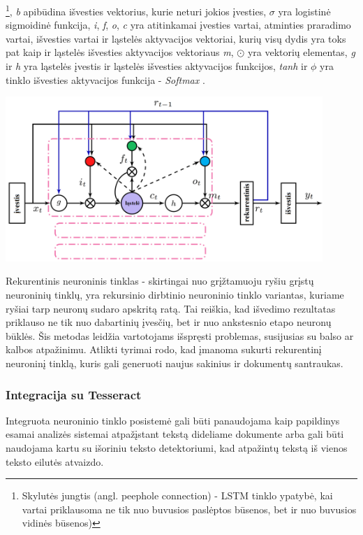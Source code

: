 \documentclass{VUMIFInfBakalaurinis}
\begin{document}
\footnote{Skylutės jungtis (angl. peephole connection) - LSTM tinklo ypatybė, kai vartai priklausoma ne tik nuo buvusios paslėptos būsenos, bet ir nuo buvusios vidinės būsenos)},
\textit{b} apibūdina išvesties vektorius, kurie neturi jokios įvesties,
\(\sigma\) yra logistinė sigmoidinė funkcija, \textit{i}, \textit{f}, \textit{o}, \textit{c} yra atitinkamai
įvesties vartai, atminties praradimo vartai, išvesties vartai ir ląstelės aktyvacijos vektoriai, kurių visų dydis yra toks pat 
kaip ir ląstelės išvesties aktyvacijos vektoriaus \textit{m}, \(\odot\) yra vektorių elementas, \textit{g} ir \textit{h} yra ląstelės
įvestis ir ląstelės išvesties aktyvacijos funkcijos, \textit{tanh} ir \(\phi\) yra tinklo išvesties aktyvacijos funkcija - \textit{Softmax} \cite{sak2014long}.

\begin{minipage}{\linewidth}
  \centering
  \includegraphics[width=12cm]{memory_block.png}
  \label{memory_block}
\end{minipage}

Rekurentinis neuroninis tinklas - skirtingai nuo grįžtamuoju ryšiu grįstų neuroninių tinklų, yra rekursinio 
dirbtinio neuroninio tinklo variantas, kuriame ryšiai tarp neuronų sudaro apskritą ratą. Tai reiškia,
kad išvedimo rezultatas priklauso ne tik nuo dabartinių įvesčių, bet ir nuo ankstesnio etapo neuronų būklės. 
Šis metodas leidžia vartotojams išspręsti problemas, susijusias su balso ar kalbos atpažinimu.
Atlikti tyrimai rodo, kad įmanoma sukurti rekurentinį neuroninį tinklą, kuris gali generuoti naujus sakinius ir dokumentų santraukas.

\subsubsection{Integracija su Tesseract}
Integruota neuroninio tinklo posistemė gali būti panaudojama kaip papildinys esamai analizės sistemai atpažįstant tekstą dideliame dokumente arba
gali būti naudojama kartu su išoriniu teksto detektoriumi, kad atpažintų tekstą iš vienos teksto eilutės atvaizdo.
\end{document}
